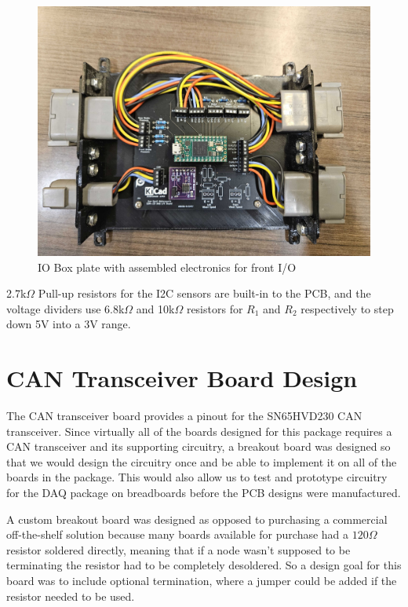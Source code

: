 \begin{figure}
    \centering
    \includegraphics[width=5in]{images/io.jpg}
    \caption{IO Box plate with assembled electronics for front I/O}
    \label{fig:io}
\end{figure}

2.7k$\Omega$ Pull-up resistors for the I2C sensors are built-in to the PCB, and the voltage dividers use 6.8k$\Omega$ and 10k$\Omega$ resistors for $R_1$ and $R_2$ respectively to step down 5V into a 3V range.



\section{CAN Transceiver Board Design}\label{sec:canboard}
The CAN transceiver board provides a pinout for the SN65HVD230 CAN transceiver.
Since virtually all of the boards designed for this package requires a CAN transceiver and its supporting circuitry, a breakout board was designed so that we would design the circuitry once and be able to implement it on all of the boards in the package.
This would also allow us to test and prototype circuitry for the DAQ package on breadboards before the PCB designs were manufactured.
\vspace{1em}

A custom breakout board was designed as opposed to purchasing a commercial off-the-shelf solution because many boards available for purchase had a $120\Omega$ resistor soldered directly, meaning that if a node wasn't supposed to be terminating the resistor had to be completely desoldered.
So a design goal for this board was to include optional termination, where a jumper could be added if the resistor needed to be used.
\vspace{1em}

